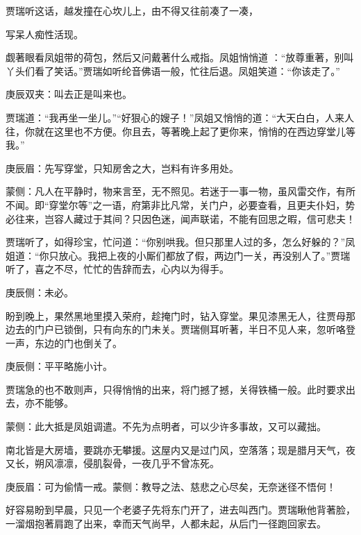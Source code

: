 \begin{parag}
    贾瑞听这话，越发撞在心坎儿上，由不得又往前凑了一凑，\begin{note}写呆人痴性活现。\end{note}觑著眼看凤姐带的荷包，然后又问戴著什么戒指。凤姐悄悄道 ：“放尊重著，别叫丫头们看了笑话。”贾瑞如听纶音佛语一般，忙往后退。凤姐笑道：“你该走了。”\begin{note}庚辰双夹：叫去正是叫来也。\end{note}贾瑞道：“我再坐一坐儿。”“好狠心的嫂子！”凤姐又悄悄的道：“大天白白，人来人往，你就在这里也不方便。你且去，等著晚上起了更你来，悄悄的在西边穿堂儿等我。”\begin{note}庚辰眉：先写穿堂，只知房舍之大，岂料有许多用处。\end{note}\begin{note}蒙侧：凡人在平静时，物来言至，无不照见。若迷于一事一物，虽风雷交作，有所不闻。即“穿堂尔等”之一语，府第非比凡常，关门户，必要查看，且更夫仆妇，势必往来，岂容人藏过于其间？只因色迷，闻声联诺，不能有回思之暇，信可悲夫！\end{note}贾瑞听了，如得珍宝，忙问道：“你别哄我。但只那里人过的多，怎么好躲的？”凤姐道：“你只放心。我把上夜的小厮们都放了假，两边门一关，再没别人了。”贾瑞听了，喜之不尽，忙忙的告辞而去，心内以为得手。\begin{note}庚辰侧：未必。\end{note}
\end{parag}


\begin{parag}
    盼到晚上，果然黑地里摸入荣府，趁掩门时，钻入穿堂。果见漆黑无人，往贾母那边去的门户已锁倒，只有向东的门未关。贾瑞侧耳听著，半日不见人来，忽听咯登一声，东边的门也倒关了。\begin{note}庚辰侧：平平略施小计。\end{note}贾瑞急的也不敢则声，只得悄悄的出来，将门撼了撼，关得铁桶一般。此时要求出去，亦不能够。\begin{note}蒙侧：此大抵是凤姐调遣。不先为点明者，可以少许多事故，又可以藏拙。\end{note}南北皆是大房墙，要跳亦无攀援。这屋内又是过门风，空落落；现是腊月天气，夜又长，朔风凛凛，侵肌裂骨，一夜几乎不曾冻死。\begin{note}庚辰眉：可为偷情一戒。蒙侧：教导之法、慈悲之心尽矣，无奈迷径不悟何！\end{note}好容易盼到早晨，只见一个老婆子先将东门开了，进去叫西门。贾瑞瞅他背著脸，一溜烟抱著肩跑了出来，幸而天气尚早，人都未起，从后门一径跑回家去。
\end{parag}


